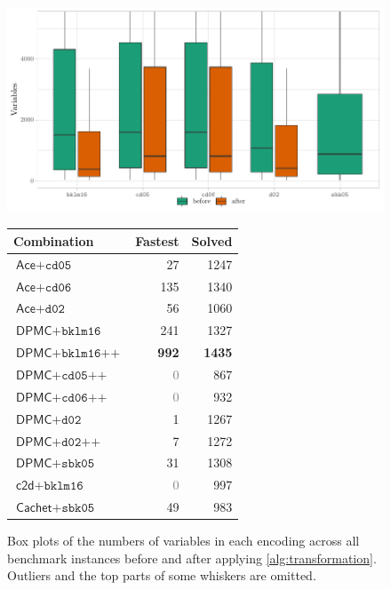 \begin{figure}
  \centering
  \begin{minipage}{0.49\textwidth}
    \centering
    \includegraphics[width=\textwidth]{chapters/wmc_without_parameters/box}
    \caption{Box plots of the numbers of variables in each encoding across all
      benchmark instances before and after applying \cref{alg:transformation}.
      Outliers and the top parts of some whiskers are
      omitted.}\label{fig:box}
  \end{minipage}\hfill
  \begin{minipage}{0.49\textwidth}
    \centering
    \begin{tabular}{lrr}
      \toprule
      Combination & Fastest & Solved \\
      \midrule
      $\textsf{Ace} + \texttt{cd05}$ & 27 & 1247 \\
      $\textsf{Ace} + \texttt{cd06}$ & 135 & 1340 \\
      $\textsf{Ace} + \texttt{d02}$ & 56 & 1060 \\
      $\textsf{DPMC} + \texttt{bklm16}$ & 241 & 1327 \\
      $\textsf{DPMC} + \texttt{bklm16++}$ & \textbf{992} & \textbf{1435} \\
      $\textsf{DPMC} + \texttt{cd05++}$ & \textcolor{gray}{0} & 867 \\
      $\textsf{DPMC} + \texttt{cd06++}$ & \textcolor{gray}{0} & 932 \\
      $\textsf{DPMC} + \texttt{d02}$ & 1 & 1267 \\
      $\textsf{DPMC} + \texttt{d02++}$ & 7 & 1272 \\
      $\textsf{DPMC} + \texttt{sbk05}$ & 31 & 1308 \\
      $\textsf{c2d} + \texttt{bklm16}$ & \textcolor{gray}{0} & 997 \\
      $\textsf{Cachet} + \texttt{sbk05}$ & 49 & 983 \\
      \bottomrule
    \end{tabular}
    \label{tbl:performance}
  \end{minipage}
\end{figure}

